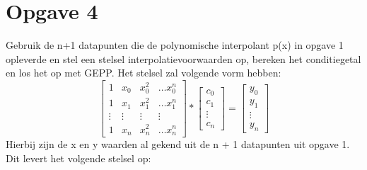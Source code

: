 \documentclass[10pt,a4paper]{article}
\begin{document}
\section{Opgave 4}
Gebruik de n+1 datapunten die de polynomische interpolant p(x) in opgave 1 opleverde en stel een stelsel interpolatievoorwaarden op, bereken het conditiegetal en los het op met GEPP.
Het stelsel zal volgende vorm hebben:
$$
\begin{bmatrix}
1 & x_{0} & x_{0}^{2} & \hdots x_{0}^{n}  \\
1 & x_{1} & x_{1}^{2} & \hdots x_{1}^{n}\\
\vdots & \vdots & \vdots & \vdots \\
1 & x_{n} & x_{n}^{2} & \hdots x_{n}^{n}
\end{bmatrix}
*
\begin{bmatrix}
c_{0} \\
c_{1}\\
\vdots \\
c_{n}
\end{bmatrix}
=
\begin{bmatrix}
y_{0} \\
y_{1}\\
\vdots \\
y_{n}
\end{bmatrix}
$$
Hierbij zijn de x en y waarden al gekend uit de n + 1 datapunten uit opgave 1. Dit levert het volgende stelsel op:
\\
\\
\end{document}
